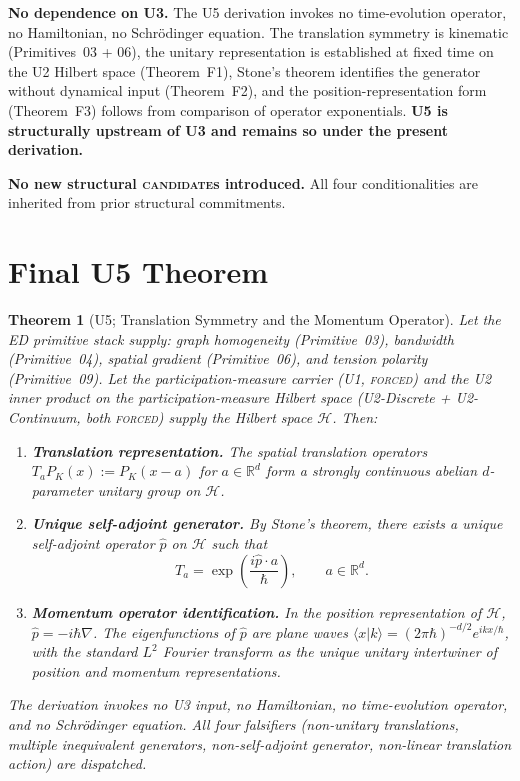 \documentclass[11pt,a4paper]{article}
\newtheorem{theorem}{Theorem}[section]
\begin{document}
\textbf{No dependence on U3.} The U5 derivation invokes no time-evolution operator, no Hamiltonian, no Schr\"odinger equation. The translation symmetry is kinematic (Primitives~03 + 06), the unitary representation is established at fixed time on the U2 Hilbert space (Theorem~F1), Stone's theorem identifies the generator without dynamical input (Theorem~F2), and the position-representation form (Theorem~F3) follows from comparison of operator exponentials. \textbf{U5 is structurally upstream of U3 and remains so under the present derivation.}

\textbf{No new structural \textsc{candidate}s introduced.} All four conditionalities are inherited from prior structural commitments.

\section{Final U5 Theorem}\label{sec:final-theorem}

\begin{theorem}[U5; Translation Symmetry and the Momentum Operator]
Let the ED primitive stack supply: graph homogeneity (Primitive~03), bandwidth (Primitive~04), spatial gradient (Primitive~06), and tension polarity (Primitive~09). Let the participation-measure carrier (U1, \textsc{forced}) and the U2 inner product on the participation-measure Hilbert space (U2-Discrete + U2-Continuum, both \textsc{forced}) supply the Hilbert space $\mathcal{H}$. Then:

\begin{enumerate}
  \item \textbf{Translation representation.} The spatial translation operators $T_a P_K(x) := P_K(x - a)$ for $a \in \mathbb{R}^d$ form a strongly continuous abelian $d$-parameter unitary group on $\mathcal{H}$.

  \item \textbf{Unique self-adjoint generator.} By Stone's theorem, there exists a unique self-adjoint operator $\hat{p}$ on $\mathcal{H}$ such that
  \[
  T_a = \exp\!\left(\frac{i \hat{p} \cdot a}{\hbar}\right), \qquad a \in \mathbb{R}^d.
  \]

  \item \textbf{Momentum operator identification.} In the position representation of $\mathcal{H}$, $\hat{p} = -i\hbar\nabla$. The eigenfunctions of $\hat{p}$ are plane waves $\langle x | k \rangle = (2\pi\hbar)^{-d/2} e^{ikx/\hbar}$, with the standard $L^2$ Fourier transform as the unique unitary intertwiner of position and momentum representations.
\end{enumerate}

The derivation invokes no U3 input, no Hamiltonian, no time-evolution operator, and no Schr\"odinger equation. All four falsifiers (non-unitary translations, multiple inequivalent generators, non-self-adjoint generator, non-linear translation action) are dispatched.
\end{theorem}
\end{document}
